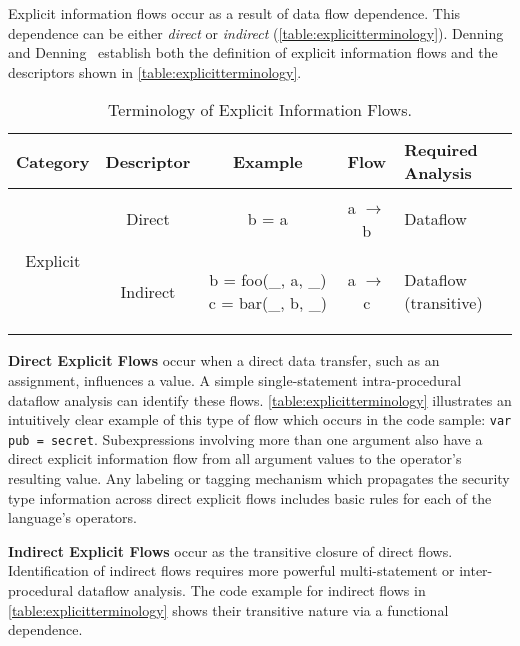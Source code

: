 Explicit information flows occur as a result of data flow dependence.
This dependence can be either \emph{direct} or \emph{indirect} (\autoref{table:explicitterminology}).
Denning and Denning~\cite{denning.denning+77} establish both the definition of explicit information flows and the descriptors shown in \autoref{table:explicitterminology}.

\begin{table*}[h]
\centering
\begin{tabular}{ccccm{2.5cm}}
\toprule
Category & Descriptor & Example & Flow & Required Analysis \\
\midrule[\heavyrulewidth]
\multirow{3}{*}{Explicit} & Direct &
\begin{js-embed}
b = a
\end{js-embed}
& a $\rightarrow$ b & Dataflow\\
\cmidrule(r){2-5} & Indirect &
\begin{js-embed}
b = foo(_, a, _)
c = bar(_, b, _)
\end{js-embed}
& a $\rightarrow$ c & Dataflow (transitive) \\
\bottomrule
\end{tabular}
\caption{Terminology of Explicit Information Flows.}
\label{table:explicitterminology}
\end{table*}

\begin{description}
\item{
\textbf{Direct Explicit Flows} occur when a direct data transfer, such as an assignment, influences a value.
A simple single-statement intra-procedural dataflow analysis can identify these flows.
\autoref{table:explicitterminology} illustrates an intuitively clear example of this type of flow which occurs in the code sample: \texttt{var pub = secret}.
Subexpressions involving more than one argument also have a direct explicit information flow from all argument values to the operator's resulting value.
Any labeling or tagging mechanism which propagates the security type information across direct explicit flows includes basic rules for each of the language's operators.
}

\item{
\textbf{Indirect Explicit Flows} occur as the transitive closure of direct flows.
Identification of indirect flows requires more powerful multi-statement or inter-procedural dataflow analysis.
The code example for indirect flows in \autoref{table:explicitterminology} shows their transitive nature via a functional dependence.
}
\end{description}

